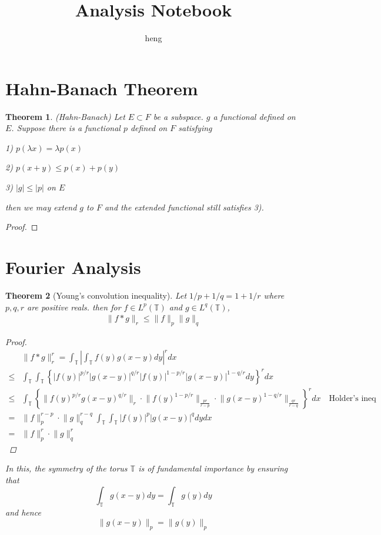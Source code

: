 \documentclass{article}
\newtheorem{theorem}{Theorem}
\begin{document}
\title{Analysis Notebook}
\author{heng}
\maketitle

\tableofcontents




\section{Hahn-Banach Theorem}

\begin{theorem}{(Hahn-Banach)}
	Let $E\subset F$ be a subspace. $g$ a functional defined on $E$. Suppose there is a functional $p$ defined on $F$ satisfying 
	
	1) $p(\lambda x)=\lambda p(x)$
	
	2) $p(x+y)\leq p(x)+p(y)$
	
	3) $|g|\leq |p|$ on $E$
	
	then we may extend $g$ to $F$ and the extended functional still satisfies 3).
\end{theorem}

\begin{proof}
	
\end{proof}



\section{Fourier Analysis}
\begin{theorem}[Young's convolution inequality]
	Let $1/p+1/q=1+1/r$ where $p,q,r$ are positive reals. then for $f\in L^p(\mathbb{T})$ and $g\in L^q(\mathbb{T})$, 
	\begin{align*}
		\lVert f*g\rVert_r\leq\lVert f \rVert_p\lVert g \rVert_q
	\end{align*}
	\begin{proof}
	\begin{align*}
		&\lVert f*g \rVert_r^r=\int_{\mathbb{T}}|\int_{\mathbb{T}}f(y)g(x-y)dy |^rdx \\
		\leq&\int_{\mathbb{T}}\int_{\mathbb{T}}\left\{|f(y)|^{p/r}|g(x-y)|^{q/r}|f(y)|^{1-p/r}|g(x-y)|^{1-q/r}dy\right\}^rdx\\
		\leq&\int_{\mathbb{T}}\left\{\lVert f(y)^{p/r}g(x-y)^{q/r} \rVert_r \cdot \lVert f(y)^{1-p/r} \rVert_{\frac{pr}{r-p}}\cdot \lVert g(x-y)^{1-q/r} \rVert_{\frac{qr}{r-q}}\right\}^rdx\quad\mbox{Holder's ineq} \\
		=&\lVert f \rVert_p^{r-p}\cdot \lVert g \rVert_q^{r-q}\int_{\mathbb{T}}\int_{\mathbb{T}}|f(y)|^p|g(x-y)|^qdydx\\
		=&\lVert f \rVert_p^r\cdot \lVert g \rVert_q^r
	\end{align*}
	\end{proof}
	In this, the symmetry of the torus $\mathbb{T}$ is of fundamental importance by ensuring that 
	$$\int_{\mathbb{T}}g(x-y)dy=\int_{\mathbb{T}}g(y)dy$$ and hence
	$$\lVert g(x-y) \rVert_p=\lVert g(y) \rVert_p$$
\end{theorem}
\end{document}
